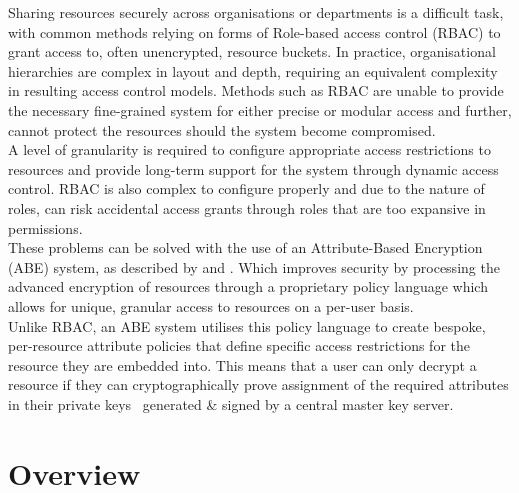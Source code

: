 Sharing resources securely across organisations or departments is a difficult task, with common methods relying on forms of Role-based access control (RBAC) \citep{Sandhu1996} to grant access to, often unencrypted, resource buckets. In practice, organisational hierarchies are complex in layout and depth, requiring an equivalent complexity in resulting access control models. Methods such as RBAC are unable to provide the necessary fine-grained system for either precise or modular access and further, cannot protect the resources should the system become compromised.\\
A level of granularity is required to configure appropriate access restrictions to resources and provide long-term support for the system through dynamic access control. RBAC is also complex to configure properly and due to the nature of roles, can risk accidental access grants through roles that are too expansive in permissions.\\
These problems can be solved with the use of an Attribute-Based Encryption (ABE) system, as described by \citet{Sahai2005} and \citet{Waters2011}. Which improves security by processing the advanced encryption of resources through a proprietary policy language which allows for unique, granular access to resources on a per-user basis.\\
Unlike RBAC, an ABE system utilises this policy language to create bespoke, per-resource attribute policies that define specific access restrictions for the resource they are embedded into. This means that a user can only decrypt a resource if they can cryptographically prove assignment of the required attributes in their private keys \textemdash\ generated \& signed by a central master key server.

\section{Overview}
\label{sec:intro_overview}


